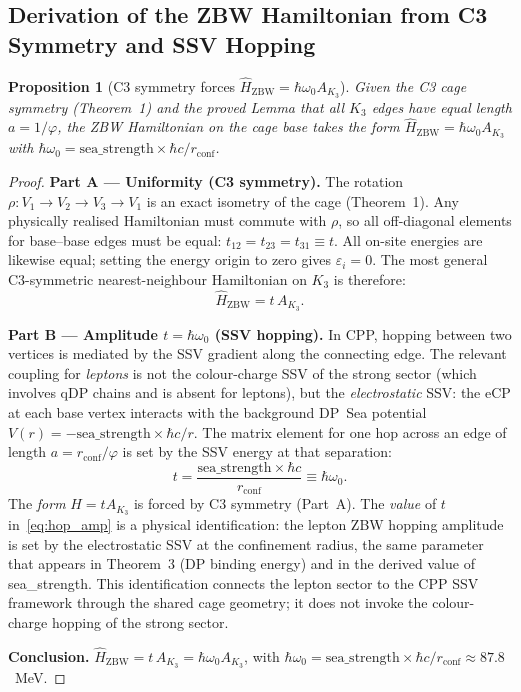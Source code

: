 \documentclass[11pt]{article}
\newtheorem{proposition}[theorem]{Proposition}
\newcommand{\ZBW}{\mathrm{ZBW}}
\begin{document}
\subsection*{Derivation of the ZBW Hamiltonian from C3 Symmetry and SSV Hopping}
\label{prop:P1_derivation}

\begin{proposition}[C3 symmetry forces $\hat{H}_\ZBW = \hbar\omega_0 A_{K_3}$]
\label{prop:H_derived}
Given the C3 cage symmetry (Theorem~1) and the proved Lemma that all
$K_3$ edges have equal length $a = 1/\varphi$, the ZBW Hamiltonian on the
cage base takes the form $\hat{H}_\ZBW = \hbar\omega_0 A_{K_3}$ with
$\hbar\omega_0 = \mathrm{sea\_strength}\times\hbar c/r_{\mathrm{conf}}$.
\end{proposition}

\begin{proof}
\textbf{Part A — Uniformity (C3 symmetry).}
The rotation $\rho: V_1\!\to\!V_2\!\to\!V_3\!\to\!V_1$ is an exact isometry
of the cage (Theorem~1). Any physically realised Hamiltonian must commute
with $\rho$, so all off-diagonal elements for base–base edges must be equal:
$t_{12} = t_{23} = t_{31} \equiv t$.  All on-site energies are likewise
equal; setting the energy origin to zero gives $\varepsilon_i = 0$.
The most general C3-symmetric nearest-neighbour Hamiltonian on $K_3$ is
therefore:
\begin{equation}
\hat{H}_\ZBW = t\, A_{K_3}.
\end{equation}

\textbf{Part B — Amplitude $t = \hbar\omega_0$ (SSV hopping).}
In CPP, hopping between two vertices is mediated by the SSV gradient
along the connecting edge.  The relevant coupling for \emph{leptons}
is not the colour-charge SSV of the strong sector (which involves
qDP chains and is absent for leptons), but the \emph{electrostatic}
SSV: the eCP at each base vertex interacts with the background DP~Sea
potential $V(r) = -\mathrm{sea\_strength}\times\hbar c/r$.  The
matrix element for one hop across an edge of length
$a = r_{\mathrm{conf}}/\varphi$ is set by the SSV energy at that
separation:
\begin{equation}
t = \frac{\mathrm{sea\_strength}\times\hbar c}{r_{\mathrm{conf}}}
\equiv \hbar\omega_0.
\label{eq:hop_amp}
\end{equation}
The \emph{form} $H = t A_{K_3}$ is forced by C3 symmetry (Part~A).
The \emph{value} of $t$ in~\eqref{eq:hop_amp} is a physical
identification: the lepton ZBW hopping amplitude is set by the
electrostatic SSV at the confinement radius, the same parameter
that appears in Theorem~3 (DP binding energy) and in the derived
value of sea\_strength.  This identification connects the lepton
sector to the CPP SSV framework through the shared cage geometry;
it does not invoke the colour-charge hopping of the strong sector.

\textbf{Conclusion.}
$\hat{H}_\ZBW = t\, A_{K_3} = \hbar\omega_0 A_{K_3}$,
with $\hbar\omega_0 = \mathrm{sea\_strength}\times\hbar c/r_{\mathrm{conf}}
\approx 87.8$~MeV.
\end{proof}
\end{document}
